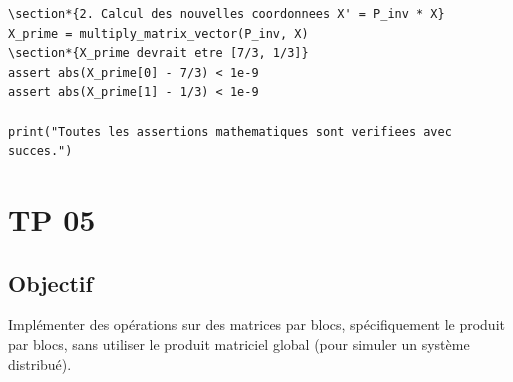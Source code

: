 \documentclass{report}
\begin{document}
\begin{verbatim}
\section*{2. Calcul des nouvelles coordonnees X' = P_inv * X}
X_prime = multiply_matrix_vector(P_inv, X)
\section*{X_prime devrait etre [7/3, 1/3]}
assert abs(X_prime[0] - 7/3) < 1e-9
assert abs(X_prime[1] - 1/3) < 1e-9

print("Toutes les assertions mathematiques sont verifiees avec succes.")
\end{verbatim}


\section*{TP 05}
\subsection*{Objectif}
Implémenter des opérations sur des matrices par blocs, spécifiquement le produit par blocs, sans utiliser le produit matriciel global (pour simuler un système distribué).
\end{document}
